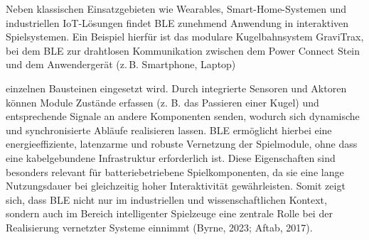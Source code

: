 Neben klassischen Einsatzgebieten wie Wearables, Smart-Home-Systemen und industriellen IoT-Lösungen findet BLE zunehmend Anwendung in interaktiven Spielsystemen. Ein Beispiel hierfür ist das modulare Kugelbahnsystem GraviTrax, bei dem BLE zur drahtlosen Kommunikation zwischen dem Power Connect Stein und dem Anwendergerät (z.\,B. Smartphone, Laptop)

einzelnen Bausteinen eingesetzt wird. Durch integrierte Sensoren und Aktoren können Module Zustände erfassen (z. B. das Passieren einer Kugel) und entsprechende Signale an andere Komponenten senden, wodurch sich dynamische und synchronisierte Abläufe realisieren lassen. BLE ermöglicht hierbei eine energieeffiziente, latenzarme und robuste Vernetzung der Spielmodule, ohne dass eine kabelgebundene Infrastruktur erforderlich ist. Diese Eigenschaften sind besonders relevant für batteriebetriebene Spielkomponenten, da sie eine lange Nutzungsdauer bei gleichzeitig hoher Interaktivität gewährleisten. Somit zeigt sich, dass BLE nicht nur im industriellen und wissenschaftlichen Kontext, sondern auch im Bereich intelligenter Spielzeuge eine zentrale Rolle bei der Realisierung vernetzter Systeme einnimmt (Byrne, 2023; Aftab, 2017).




